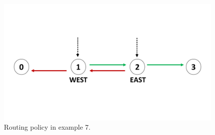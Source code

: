 
\begin{figure}[h]
	\centering
	\includegraphics[width=0.65\linewidth]{plots/BgpColoredRouting.pdf}
	\caption{Routing policy in example 7.}
	\label{fig:pdfimage}
\end{figure}

\newpage